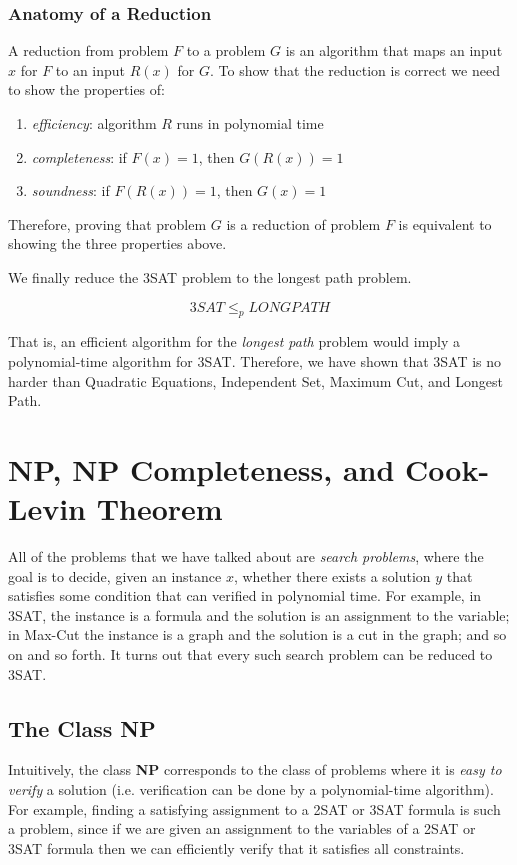 \documentclass{article}
\begin{document}
  \subsubsection{Anatomy of a Reduction}
  A reduction from problem $F$ to a problem $G$ is an algorithm that maps an input $x$ for $F$ to an input $R(x)$ for $G$. To show that the reduction is correct we need to show the properties of: 
  \begin{enumerate}
      \item \textit{efficiency}: algorithm $R$ runs in polynomial time
      \item \textit{completeness}: if $F(x) = 1$, then $G(R(x)) = 1$ 
      \item \textit{soundness}: if $F(R(x)) = 1$, then $G(x) = 1$
  \end{enumerate}
  Therefore, proving that problem $G$ is a reduction of problem $F$ is equivalent to showing the three properties above. 

  We finally reduce the 3SAT problem to the longest path problem. 

  \begin{theorem}
  \[3SAT \leq_p LONGPATH\]
  \end{theorem}
  That is, an efficient algorithm for the \textit{longest path} problem would imply a polynomial-time algorithm for 3SAT. Therefore, we have shown that 3SAT is no harder than Quadratic Equations, Independent Set, Maximum Cut, and Longest Path. 

\section{NP, NP Completeness, and Cook-Levin Theorem}

  All of the problems that we have talked about are \textit{search problems}, where the goal is to decide, given an instance $x$, whether there exists a solution $y$ that satisfies some condition that can verified in polynomial time. For example, in 3SAT, the instance is a formula and the solution is an assignment to the variable; in Max-Cut the instance is a graph and the solution is a cut in the graph; and so on and so forth. It turns out that every such search problem can be reduced to 3SAT. 

  \subsection{The Class NP}
  Intuitively, the class \textbf{NP} corresponds to the class of problems where it is \textit{easy to verify} a solution (i.e. verification can be done by a polynomial-time algorithm). For example, finding a satisfying assignment to a 2SAT or 3SAT formula is such a problem, since if we are given an assignment to the variables of a 2SAT or 3SAT formula then we can efficiently verify that it satisfies all constraints. 
\end{document}
